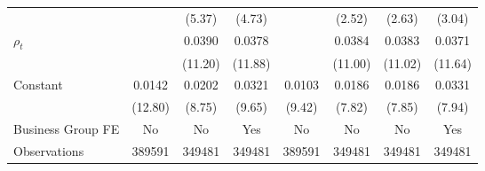 {\begin{tabular}{l*{7}{c}}
                &                  &   (5.37)         &   (4.73)         &                  &   (2.52)         &   (2.63)         &   (3.04)         \\
[1em]
 $ {\rho_t} $   &                  &   0.0390\sym{***}&   0.0378\sym{***}&                  &   0.0384\sym{***}&   0.0383\sym{***}&   0.0371\sym{***}\\
                &                  &  (11.20)         &  (11.88)         &                  &  (11.00)         &  (11.02)         &  (11.64)         \\
[1em]
Constant        &   0.0142\sym{***}&   0.0202\sym{***}&   0.0321\sym{***}&   0.0103\sym{***}&   0.0186\sym{***}&   0.0186\sym{***}&   0.0331\sym{***}\\
                &  (12.80)         &   (8.75)         &   (9.65)         &   (9.42)         &   (7.82)         &   (7.85)         &   (7.94)         \\
\hline
Business Group FE&       No         &       No         &      Yes         &       No         &       No         &       No         &      Yes         \\
Observations    &   389591         &   349481         &   349481         &   389591         &   349481         &   349481         &   349481         \\
\hline\hline  \end{tabular}}

